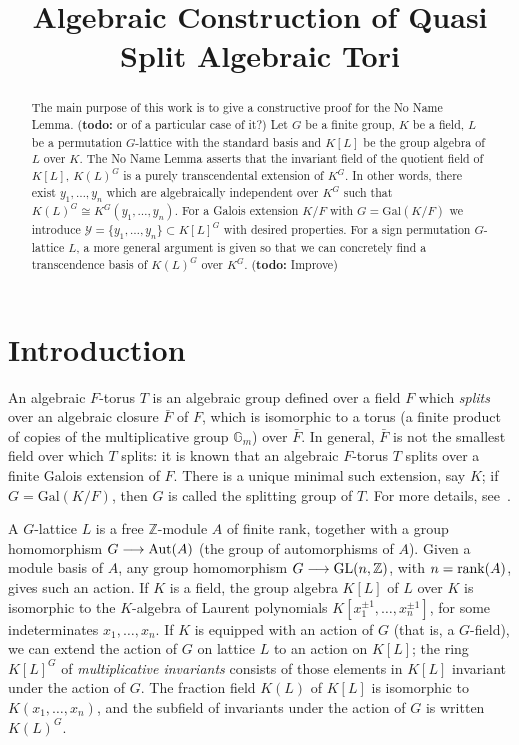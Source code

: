 \documentclass[12pt]{article}
\title{Algebraic Construction of Quasi Split Algebraic Tori}
\author{}
\theoremstyle{plain}
\def\todo#1{(\textbf{todo:} #1)}
\newcommand{\Z}{\ensuremath{\mathbb{Z}}}
\begin{document}
\maketitle


\begin{abstract}

The main purpose of this work is to give a constructive proof for the
No Name Lemma. \todo{or of a particular case of it?} Let $G$ be a
finite group, $K$ be a field, $L$ be a permutation $G$-lattice with
the standard basis and $K[L]$ be the group algebra of $L$ over
$K$. The No Name Lemma asserts that the invariant field of the
quotient field of $K[L]$, $K(L)^G$ is a purely transcendental
extension of $K^G$. In other words, there exist $y_1, \ldots , y_n$
which are algebraically independent over $K^G$ such that $K(L)^G \cong
K^G(y_1, \ldots , y_n)$. For a Galois extension $K/F$ with $G =
\mathrm{Gal}(K/F)$ we introduce $\mathcal{Y}=\lbrace y_1, \ldots, y_n
\rbrace \subset K[L]^G$ with desired properties. For a sign
permutation $G$-lattice $L$, a more general argument is given so that
we can concretely find a transcendence basis of $K(L)^G$ over
$K^G$.  \todo{Improve}
\end{abstract}

\section{Introduction}



An algebraic $F$-torus $T$ is an algebraic group defined over a field
$F$ which {\em splits} over an algebraic closure $\bar F$ of $F$, which is
 isomorphic to a torus (a finite product of copies of the
multiplicative group $\mathbb{G}_m$) over $\bar{F}$. In general,
$\bar{F}$ is not the smallest field over which $T$ splits: it is known
that an algebraic $F$-torus $T$ splits over a finite Galois extension
of $F$. There is a unique minimal such extension, say $K$; if $G =
\mathrm{Gal}(K/F)$, then $G$ is called the splitting group of $T$. For
more details, see~\cite[Chapter 2]{Voskresenskii}.


A $G$-lattice $L$ is a free $\Z$-module $A$ of finite rank, together
with a group homomorphism $G \longrightarrow {\rm Aut}(A)$ (the group
of automorphisms of $A$). Given a module basis of $A$, any group
homomorphism $G \longrightarrow {\rm GL}(n,\Z)$, with $n={\rm
  rank}(A)$, gives such an action.  If $K$ is a field, the group
algebra $K[L]$ of $L$ over $K$ is isomorphic to the $K$-algebra of
Laurent polynomials $K[x_1^{\pm 1},\dots,x_n^{\pm 1}]$, for some
indeterminates $x_1,\dots,x_n$.  If $K$ is equipped with an action of
$G$ (that is, a $G$-field), we can extend the action of $G$ on lattice
$L$ to an action on $K[L]$; the ring $K[L]^G$ of {\em multiplicative
  invariants} consists of those elements in $K[L]$ invariant under the
action of $G$. The fraction field $K(L)$ of $K[L]$ is isomorphic to
$K(x_1,\dots,x_n)$, and the subfield of invariants under the action of
$G$ is written $K(L)^G$.
\end{document}
